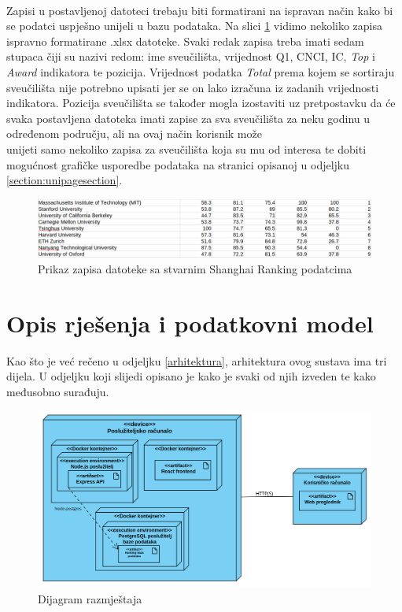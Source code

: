 \documentclass[times, utf8, zavrsni]{fer}
\begin{document}
\\Zapisi u postavljenoj datoteci trebaju biti formatirani na ispravan način kako bi se podatci uspješno unijeli u bazu podataka. 
Na slici \ref{fig:real} vidimo nekoliko zapisa ispravno formatirane .xlsx datoteke. Svaki redak zapisa treba imati sedam stupaca čiji su nazivi redom:
ime sveučilišta, vrijednost Q1, CNCI, IC, \emph{Top} i \emph{Award} indikatora te pozicija. Vrijednost podatka \emph{Total} prema kojem se sortiraju 
sveučilišta nije potrebno upisati jer se on lako izračuna iz zadanih vrijednosti indikatora. Pozicija sveučilišta se također mogla
izostaviti uz pretpostavku da će svaka postavljena datoteka imati zapise za sva sveučilišta za neku godinu u određenom području, ali
na ovaj način korisnik može \\unijeti samo nekoliko zapisa za sveučilišta koja su mu od interesa te dobiti mogućnost 
grafičke usporedbe podataka na stranici opisanoj u odjeljku \ref{section:unipagesection}.
\begin{figure}[htb]
    \hspace*{-2cm} 
       \includegraphics[scale=0.3]{real.png} 
       \caption{Prikaz zapisa datoteke sa stvarnim Shanghai Ranking podatcima}
       \label{fig:real}
       \end{figure}  

\chapter{Opis rješenja i podatkovni model}
Kao što je već rečeno u odjeljku \ref{arhitektura}, arhitektura ovog sustava ima tri dijela. U odjeljku koji slijedi opisano je kako je svaki od njih izveden
te kako međusobno surađuju.
\begin{figure}[htb]
    \hspace*{-2.5cm} 
       \includegraphics[scale=0.3]{razmjestaj.png} 
       \caption{Dijagram razmještaja}
       \label{fig:razmjestaj}
       \end{figure}  
\end{document}
